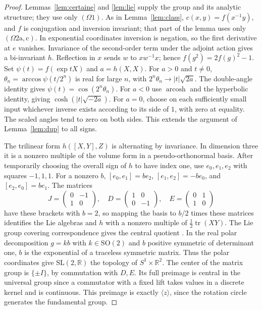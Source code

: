 \documentclass[11pt,reqno]{amsart}
\theoremstyle{definition}
\theoremstyle{remark}
\numberwithin{equation}{section}
\newcommand{\R}{\mathbb{R}}
\begin{document}
\begin{proof}
Lemmas~\ref{lem:certaine} and \ref{lem:lie} supply the group and its analytic
structure; they use only $(\Omega1)$. As in Lemma~\ref{lem:class}, \(c(x,y)=f(x^{-1}y)\), and \(f\)
is conjugation and inversion invariant; that part of the lemma uses only $(\Omega2\mathrm{a,c})$. In exponential coordinates inversion
is negation, so the first derivative at \(e\) vanishes. Invariance of the
second-order term under the adjoint action gives a bi-invariant \(h\).
Reflection in \(x\) sends \(w\) to \(xw^{-1}x\); hence
\(f(g^2)=2f(g)^2-1\). Set \(\psi(t)=f(\exp tX)\) and
\(a=h(X,X)\). For \(a>0\) and \(t\ne0\),
\(\theta_n=\arccos\psi(t/2^n)\) is real for large \(n\), with
\(2^n\theta_n\to |t|\sqrt{2a}\). The double-angle identity gives
\(\psi(t)=\cos(2^n\theta_n)\). For \(a<0\) use \(\operatorname{arcosh}\)
and the hyperbolic identity, giving \(\cosh(|t|\sqrt{-2a})\).
For \(a=0\), choose on each sufficiently small input whichever inverse
exists according to its side of \(1\), with zero at equality. The scaled
angles tend to zero on both sides. This extends the argument of
Lemma~\ref{lem:dup} to all signs.

The trilinear form \(h([X,Y],Z)\) is alternating by invariance. In dimension
three it is a nonzero multiple of the volume form in a pseudo-orthonormal
basis. After temporarily choosing the overall sign of \(h\) to have index
one, use \(e_0,e_1,e_2\) with squares \(-1,1,1\). For a nonzero \(b\),
\([e_0,e_1]=be_2\), \([e_1,e_2]=-be_0\), and \([e_2,e_0]=be_1\).
The matrices
\[
 J=\begin{pmatrix}0&-1\\1&0\end{pmatrix},\quad
 D=\begin{pmatrix}1&0\\0&-1\end{pmatrix},\quad
 E=\begin{pmatrix}0&1\\1&0\end{pmatrix}
\]
have these brackets with \(b=2\), so mapping the basis to \(b/2\)
times these matrices identifies the Lie algebras and \(h\) with a
nonzero multiple of \(\tfrac12\operatorname{tr}(XY)\).
The Lie group covering correspondence gives the central quotient
\cite[Ch.~II]{Helgason}. In the real polar decomposition \(g=kb\)
with \(k\in\mathrm{SO}(2)\) and \(b\) positive symmetric of determinant one,
\(b\) is the exponential of a traceless symmetric matrix. Thus the polar
coordinates give \(\mathrm{SL}(2,\R)\) the topology of \(S^1\times\R^2\).
The center of the matrix group is \(\{\pm I\}\), by commutation with \(D,E\).
Its full preimage is central in the universal group since a commutator
with a fixed lift takes values in a discrete kernel and is continuous.
This preimage is exactly \(\langle z\rangle\), since the rotation circle
generates the fundamental group.


\end{proof}
\end{document}
